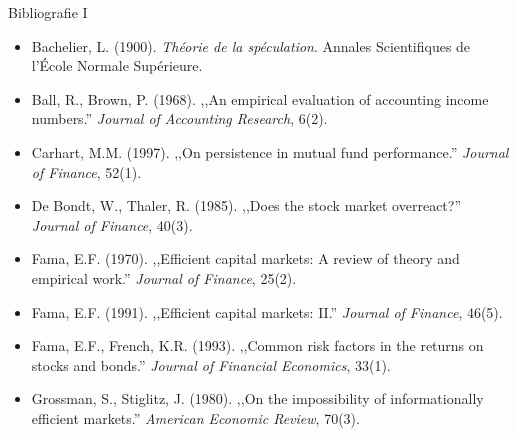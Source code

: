 \documentclass[9pt, aspectratio=169, t]{beamer}
\theoremstyle{definition}
\newenvironment{cminipage}[1]{%
    \par\noindent\hfill\begin{minipage}{#1}\ignorespaces
}{%
    \end{minipage}\hfill\null\par
}
\begin{document}

\begin{frame}[shrink=15]{Bibliografie I}
\begin{cminipage}{0.95\textwidth}
{\small
\begin{itemize}\setlength{\itemsep}{2pt}
    \item Bachelier, L. (1900). \textit{Th\'{e}orie de la sp\'{e}culation}. Annales Scientifiques de l'\'{E}cole Normale Sup\'{e}rieure.
    \item Ball, R., Brown, P. (1968). ,,An empirical evaluation of accounting income numbers.'' \textit{Journal of Accounting Research}, 6(2).
    \item Carhart, M.M. (1997). ,,On persistence in mutual fund performance.'' \textit{Journal of Finance}, 52(1).
    \item De Bondt, W., Thaler, R. (1985). ,,Does the stock market overreact?'' \textit{Journal of Finance}, 40(3).
    \item Fama, E.F. (1970). ,,Efficient capital markets: A review of theory and empirical work.'' \textit{Journal of Finance}, 25(2).
    \item Fama, E.F. (1991). ,,Efficient capital markets: II.'' \textit{Journal of Finance}, 46(5).
    \item Fama, E.F., French, K.R. (1993). ,,Common risk factors in the returns on stocks and bonds.'' \textit{Journal of Financial Economics}, 33(1).
    \item Grossman, S., Stiglitz, J. (1980). ,,On the impossibility of informationally efficient markets.'' \textit{American Economic Review}, 70(3).
\end{itemize}
}
\end{cminipage}
\end{frame}
\end{document}
